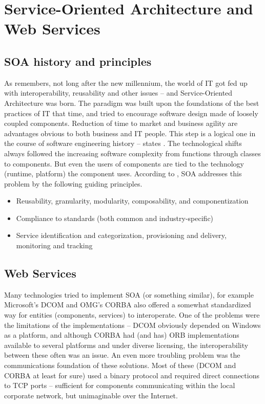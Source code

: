 \chapter{Service-Oriented Architecture and Web Services}

\section{SOA history and principles}

As \cite{soa_modeling} remembers, not long after the new millennium, the world of IT got fed up with interoperability, reusability and other issues -- and Service-Oriented Architecture was born. The paradigm was built upon the foundations of the best practices of IT that time, and tried to encourage software design made of loosely coupled components. Reduction of time to market and business agility are advantages obvious to both business and IT people. This step is a logical one in the course of software engineering history -- states \cite{devcom_soa_intro}. The technological shifts always followed the increasing software complexity from functions through classes to components. But even the users of components are tied to the technology (runtime, platform) the component uses. According to \cite{ibm_soa_impro}, SOA addresses this problem by the following guiding principles.

\begin{itemize}
 \item Reusability, granularity, modularity, composability, and componentization
 \item Compliance to standards (both common and industry-specific)
 \item Service identification and categorization, provisioning and delivery, monitoring and tracking
\end{itemize}

\section{Web Services}

Many technologies tried to implement SOA (or something similar), for example Microsoft's DCOM and OMG's CORBA also offered a somewhat standardized way for entities (components, services) to interoperate. One of the problems were the limitations of the implementations -- DCOM obviously depended on Windows as a platform, and although CORBA had (and has) ORB implementations available to several platforms and under diverse licensing, the interoperability between these often was an issue. An even more troubling problem was the communications foundation of these solutions. Most of these (DCOM and CORBA at least for sure) used a binary protocol and required direct connections to TCP ports -- sufficient for components communicating within the local corporate network, but unimaginable over the Internet.

